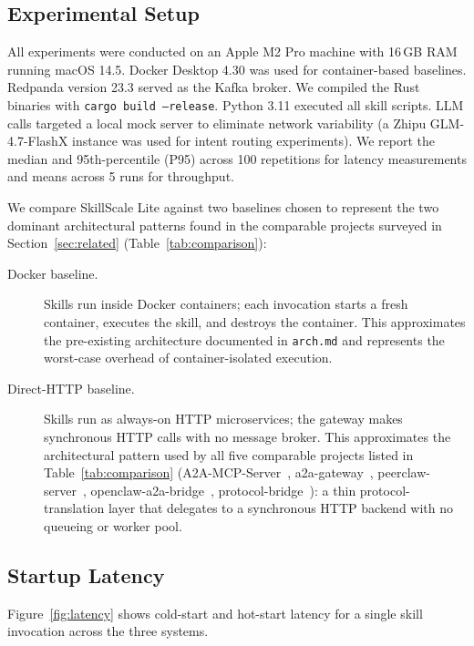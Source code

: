 \documentclass[sigconf,nonacm]{acmart}
\begin{document}
\subsection{Experimental Setup}

All experiments were conducted on an Apple M2 Pro machine with 16\,GB RAM running macOS 14.5. Docker Desktop 4.30 was used for container-based baselines. Redpanda version 23.3 served as the Kafka broker. We compiled the Rust binaries with \texttt{cargo build --release}. Python 3.11 executed all skill scripts. LLM calls targeted a local mock server to eliminate network variability (a Zhipu GLM-4.7-FlashX instance was used for intent routing experiments). We report the median and 95th-percentile (P95) across 100 repetitions for latency measurements and means across 5 runs for throughput.

We compare SkillScale Lite against two baselines chosen to represent the two dominant architectural patterns found in the comparable projects surveyed in Section~\ref{sec:related} (Table~\ref{tab:comparison}):

\begin{description}
  \item[Docker baseline.] Skills run inside Docker containers; each invocation starts a fresh container, executes the skill, and destroys the container. This approximates the pre-existing architecture documented in \texttt{arch.md} and represents the worst-case overhead of container-isolated execution.
  \item[Direct-HTTP baseline.] Skills run as always-on HTTP microservices; the gateway makes synchronous HTTP calls with no message broker. This approximates the architectural pattern used by all five comparable projects listed in Table~\ref{tab:comparison} (A2A-MCP-Server~\cite{a2amcpserver2024}, a2a-gateway~\cite{a2agateway2024}, peerclaw-server~\cite{peerclaw2024}, openclaw-a2a-bridge~\cite{openclaw2024}, protocol-bridge~\cite{protocolbridge2024}): a thin protocol-translation layer that delegates to a synchronous HTTP backend with no queueing or worker pool.
\end{description}

\subsection{Startup Latency}

Figure~\ref{fig:latency} shows cold-start and hot-start latency for a single skill invocation across the three systems.
\end{document}
